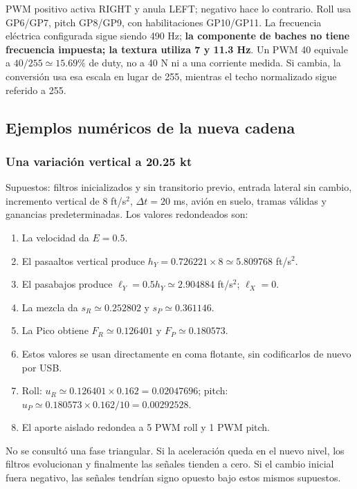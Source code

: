\documentclass[11pt,a4paper]{article}
\newcommand{\code}[1]{\texttt{\detokenize{#1}}}
\begin{document}
PWM positivo activa RIGHT y anula LEFT; negativo hace lo contrario. Roll usa GP6/GP7, pitch GP8/GP9, con habilitaciones GP10/GP11. La frecuencia eléctrica configurada sigue siendo 490 Hz; \textbf{la componente de baches no tiene frecuencia impuesta; la textura utiliza 7 y 11.3 Hz}. Un PWM 40 equivale a $40/255\simeq15.69\%$ de duty, no a 40 N ni a una corriente medida. Si \code{PWM_MAX} cambia, la conversión usa esa escala en lugar de 255, mientras el techo normalizado sigue referido a 255.

\subsection{Ejemplos numéricos de la nueva cadena}
\subsubsection{Una variación vertical a 20.25 kt}
Supuestos: filtros inicializados y sin transitorio previo, entrada lateral sin cambio, incremento vertical de 8 ft/s$^2$, $\Delta t=20$ ms, avión en suelo, tramas válidas y ganancias predeterminadas. Los valores redondeados son:
\begin{enumerate}
\item La velocidad da $E=0.5$.
\item El pasaaltos vertical produce $h_Y=0.726221\times8\simeq5.809768$ ft/s$^2$.
\item El pasabajos produce $\ell_Y=0.5h_Y\simeq2.904884$ ft/s$^2$; $\ell_X=0$.
\item La mezcla da $s_R\simeq0.252802$ y $s_P\simeq0.361146$.
\item La Pico obtiene $F_R\simeq0.126401$ y $F_P\simeq0.180573$.
\item Estos valores se usan directamente en coma flotante, sin codificarlos de nuevo por USB.
\item Roll: $u_R\simeq0.126401\times0.162=0.02047696$; pitch: $u_P\simeq0.180573\times0.162/10=0.00292528$.
\item El aporte aislado redondea a 5 PWM roll y 1 PWM pitch.
\end{enumerate}
No se consultó una fase triangular. Si la aceleración queda en el nuevo nivel, los filtros evolucionan y finalmente las señales tienden a cero. Si el cambio inicial fuera negativo, las señales tendrían signo opuesto bajo estos mismos supuestos.
\end{document}
